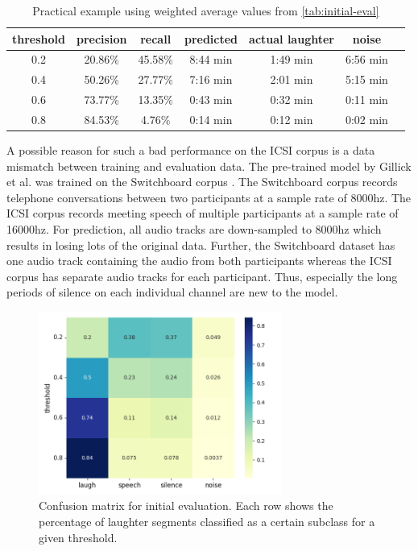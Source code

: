 \documentclass[bsc,frontabs,parskip,deptreport]{infthesis}
\begin{document}
\begin{table}[]
    \centering
    \begin{tabular}{|c|c|c|c|c|c|c|}
      \hline
      threshold & precision & recall & predicted & actual laughter & noise \\
      \hline
      0.2 &  20.86\% & 45.58\% & 8:44 min & 1:49 min & 6:56 min \\
      0.4 &  50.26\% & 27.77\% & 7:16 min & 2:01 min & 5:15 min \\
      0.6 &  73.77\% & 13.35\% & 0:43 min & 0:32 min & 0:11 min \\
      0.8 &  84.53\% & 4.76\% & 0:14 min & 0:12 min & 0:02 min \\
      \hline
    \end{tabular}
    \caption{Practical example using weighted average values from \autoref{tab:initial-eval}}
    \label{tab:practical-example}
\end{table}


A possible reason for such a bad performance on the ICSI corpus is a data mismatch between training and evaluation data. The pre-trained model by Gillick et al. \citep{gillick2021robust} was trained on the Switchboard corpus \citep{switchboard-corpus}. The Switchboard corpus records telephone conversations between two participants at a sample rate of 8000hz. The ICSI corpus records meeting speech of multiple participants at a sample rate of 16000hz. For prediction, all audio tracks are down-sampled to 8000hz which results in losing lots of the original data. 
Further, the Switchboard dataset has one audio track containing the audio from both participants whereas the ICSI corpus has separate audio tracks for each participant. Thus, especially the long periods of silence on each individual channel are new to the model. 

\begin{figure}[h!]
    \centering
    \includegraphics[width=8cm]{imgs/conf_matrix/init_eval_all.png}
    \caption{Confusion matrix for initial evaluation.  Each row shows the percentage of laughter segments classified as a certain subclass for a given threshold.}
    \label{fig:initial-conf-matrix}
\end{figure}
\end{document}
